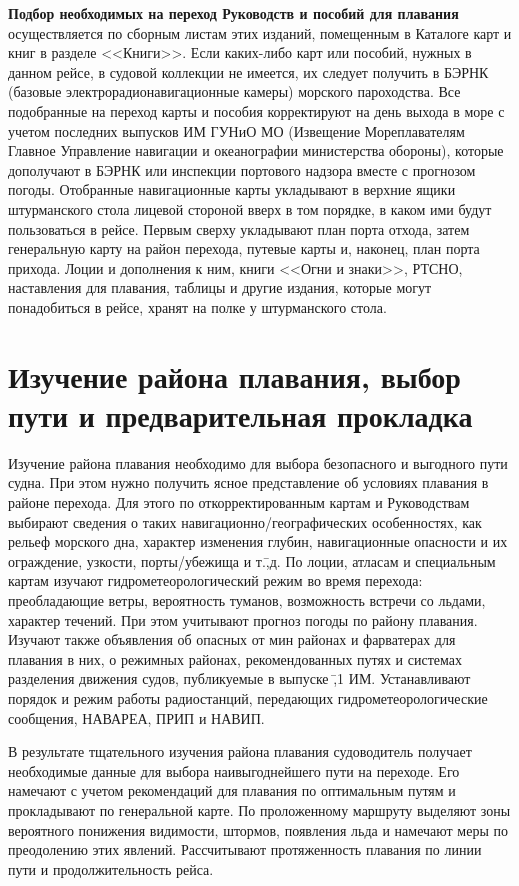 \documentclass[a4paper, 12pt, twoside, final, book, russian, fittopage, cyremdash]{ncc}
\begin{document}
\textbf{Подбор необходимых на переход Руководств и пособий для плавания} осуществляется по сборным листам этих изданий, помещенным в Каталоге карт и книг в разделе <<Книги>>. Если каких-либо карт или пособий, нужных в данном рейсе, в судовой коллекции не имеется, их следует получить в БЭРНК (базовые электрорадионавигационные камеры) морского пароходства. Все подобранные на переход карты и пособия корректируют на день выхода в море с учетом последних выпусков ИМ ГУНиО МО (Извещение Мореплавателям Главное Управление навигации и океанографии министерства обороны), которые дополучают в БЭРНК или инспекции портового надзора вместе с прогнозом погоды. Отобранные навигационные карты укладывают в верхние ящики штурманского стола лицевой стороной вверх в том порядке, в каком ими будут пользоваться в рейсе. Первым сверху укладывают план порта отхода, затем генеральную карту на район перехода, путевые карты и, наконец, план порта прихода. Лоции и дополнения к ним, книги <<Огни и знаки>>, РТСНО, наставления для плавания, таблицы и другие издания, которые могут понадобиться в рейсе, хранят на полке у штурманского стола. 

\section{Изучение района плавания, выбор пути и предварительная прокладка}

Изучение района плавания необходимо для выбора безопасного и выгодного пути судна. При этом нужно получить ясное представление об условиях плавания в районе перехода. Для этого по откорректированным картам и Руководствам выбирают сведения о таких навигационно\-/географических особенностях, как рельеф морского дна, характер изменения глубин, навигационные опасности и их ограждение, узкости, порты\-/убежища и т.\=,д. По лоции, атласам и специальным картам изучают гидрометеорологический режим во время перехода: преобладающие ветры, вероятность туманов, возможность встречи со льдами, характер течений. При этом учитывают прогноз погоды по району плавания. Изучают также объявления об опасных от мин районах и фарватерах для плавания в них, о режимных районах, рекомендованных путях и системах разделения движения судов, публикуемые в выпуске \No\=,1 ИМ. Устанавливают порядок и режим работы радиостанций, передающих гидрометеорологические сообщения, НАВАРЕА, ПРИП и НАВИП. 

В результате тщательного изучения района плавания судоводитель получает необходимые данные для выбора наивыгоднейшего пути на переходе. Его намечают с учетом рекомендаций для плавания по оптимальным путям и прокладывают по генеральной карте. По проложенному маршруту выделяют зоны вероятного понижения видимости, штормов, появления льда и намечают меры по преодолению этих явлений. Рассчитывают протяженность плавания по линии пути и продолжительность рейса.
 
\end{document}
